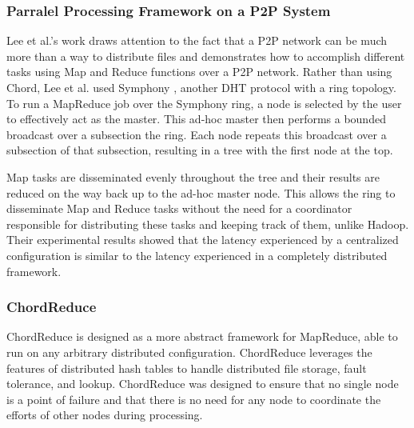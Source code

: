 \documentclass[10pt,letterpaper,twoside]{report}
\begin{document}
\subsubsection{Parralel Processing Framework on a P2P System}
Lee et al.'s work \cite{leemap} draws attention to the fact that a P2P network can be much more than a way to distribute files and demonstrates how to accomplish different tasks using Map and Reduce functions over a P2P network.  
Rather than using Chord, Lee et al. used Symphony \cite{symphony}, another DHT protocol with a ring topology.  
To run a MapReduce job over the Symphony ring, a node is selected by the user to effectively act as the master.  
This ad-hoc master then performs a bounded broadcast over a subsection the ring.  
Each node repeats this broadcast over a subsection of that subsection, resulting in a tree with the first node at the top.  

Map tasks are disseminated evenly throughout the tree and their results are reduced on the way back up to the ad-hoc master node.  
This allows the ring to disseminate Map and Reduce tasks without the need for a coordinator responsible for distributing these tasks and keeping track of them, unlike Hadoop.  
Their experimental results showed that the latency experienced by a centralized configuration is similar to the latency experienced in a completely distributed framework.





\subsubsection{ChordReduce}
ChordReduce is designed as a more abstract framework for MapReduce, able to run on any arbitrary distributed configuration.
ChordReduce leverages the features of distributed hash tables to handle distributed file storage, fault tolerance, and lookup.  
ChordReduce  was designed to ensure that no single node is a point of failure and that there is no need for any node to coordinate the efforts of other nodes during processing.  
\end{document}
